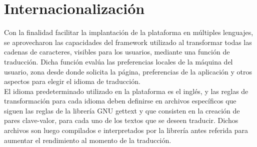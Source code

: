 \section{Internacionalización}
Con la finalidad facilitar la implantación de la plataforma en múltiples lenguajes, se aprovecharon las capacidades del framework utilizado al transformar todas las cadenas de caracteres, visibles para los usuarios, mediante una función de traducción. Dicha función evalúa las preferencias locales de la máquina del usuario, zona desde donde solicita la página, preferencias de la aplicación y otros aspectos para elegir el idioma de traducción.\\

El idioma predeterminado utilizado en la plataforma es el inglés, y las reglas de transformación para cada idioma deben definirse en archivos específicos que siguen las reglas de la librería GNU gettext y que consisten en la creación de pares clave-valor, para cada uno de los textos que se deseen traducir. Dichos archivos son luego compilados e interpretados por la librería antes referida para aumentar el rendimiento al momento de la traducción.